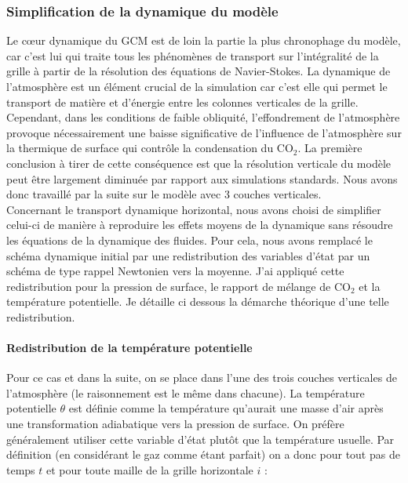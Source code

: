 \documentclass[11pt,a4paper]{article}
\begin{document}
\subsubsection{Simplification de la dynamique du modèle}
\label{dyn}
Le c\oe ur dynamique du GCM est de loin la partie la plus chronophage du modèle, car c'est lui qui traite tous les phénomènes de transport sur l'intégralité de la grille à partir de la résolution des équations de Navier-Stokes. La dynamique de l'atmosphère est un élément crucial de la simulation car c'est elle qui permet le transport de matière et d'énergie entre les colonnes verticales de la grille. Cependant, dans les conditions de faible obliquité, l'effondrement de l'atmosphère provoque nécessairement une baisse significative de l'influence de l'atmosphère sur la thermique de surface qui contrôle la condensation du CO$_2$. La première conclusion à tirer de cette conséquence est que la résolution verticale du modèle peut être largement diminuée par rapport aux simulations standards. Nous avons donc travaillé par la suite sur le modèle avec 3 couches verticales. \\

Concernant le transport dynamique horizontal, nous avons choisi de simplifier celui-ci de manière à reproduire les effets moyens de la dynamique sans résoudre les équations de la dynamique des fluides. Pour cela, nous avons remplacé le schéma dynamique initial par une redistribution des variables d'état par un schéma de type rappel Newtonien vers la moyenne.
J'ai appliqué cette redistribution pour la pression de surface, le rapport de mélange de CO$_2$ et la température potentielle. Je détaille ci dessous la démarche théorique d'une telle redistribution. \\

\paragraph{Redistribution de la température potentielle \\} 
Pour ce cas et dans la suite, on se place dans l'une des trois couches verticales de l'atmosphère (le raisonnement est le même dans chacune). La température potentielle $\theta$ est définie comme la température qu'aurait une masse d'air après une transformation adiabatique vers la pression de surface. On préfère généralement utiliser cette variable d'état plutôt que la température usuelle. Par définition (en considérant le gaz comme étant parfait) on a donc pour tout pas de temps $t$ et pour toute maille de la grille horizontale $i$ :
\end{document}
